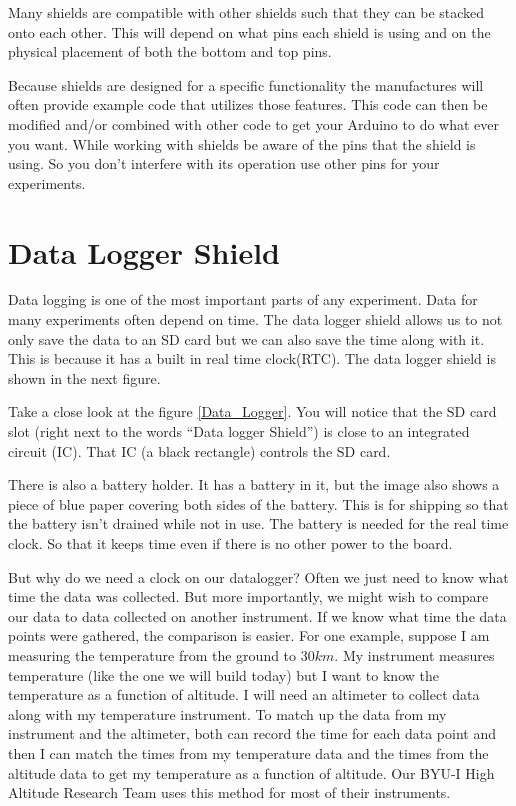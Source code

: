 	Many shields are compatible with other shields such that they can be stacked onto each other. This will depend on what pins each shield is using and on the physical placement of both the bottom and top pins.
	
	Because shields are designed for a specific functionality the manufactures will often provide example code that utilizes those features. This code can then be modified and/or combined with other code to get your Arduino to do what ever you want. While working with shields be aware of the pins that the shield is using. So you don't interfere with its operation use other pins for your experiments.

\section{Data Logger Shield}
	Data logging is one of the most important parts of any experiment. Data for many experiments often depend on time. The data logger shield allows us to not only save the data to an SD card but we can also save the time along with it. This is because it has a built in real time clock(RTC). The data logger shield is shown in the next figure.
	
	Take a close look at the figure \ref{Data_Logger}. You will notice that the SD card slot (right next to the words ``Data logger Shield'') is close to an integrated circuit (IC). That IC (a black rectangle) controls the SD card. 
	
	There is also a battery holder. It has a battery in it, but the image also shows a piece of blue paper covering both sides of the battery. This is for shipping so that the battery isn't drained while not in use. The battery is needed for the real time clock. So that it keeps time even if there is no other power to the board. 
	
	But why do we need a clock on our datalogger?  Often we just need to know what time the data was collected.  But more importantly, we might wish to compare our data to data collected on another instrument. If we know what time the data points were gathered, the comparison is easier.  For one example, suppose I am measuring the temperature from the ground to $30km$. My instrument measures temperature (like the one we will build today) but I want to know the temperature as a function of altitude.  I will need an altimeter to collect data along with my temperature instrument.  To match up the data from my instrument and the altimeter, both can record the time for each data point and then I can match the times from my temperature data and the times from the altitude data to get my temperature as a function of altitude.  Our BYU-I High Altitude Research Team uses this method for most of their instruments.
	
